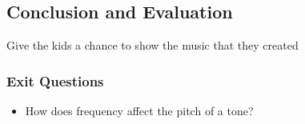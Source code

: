 \documentclass{lessonplan}
\begin{document}
    \subsection{Conclusion and Evaluation}
      Give the kids a chance to show the music that they created
      \subsubsection{Exit Questions}
      \begin{itemize}
        \item How does frequency affect the pitch of a tone?
      \end{itemize}
\end{document}
